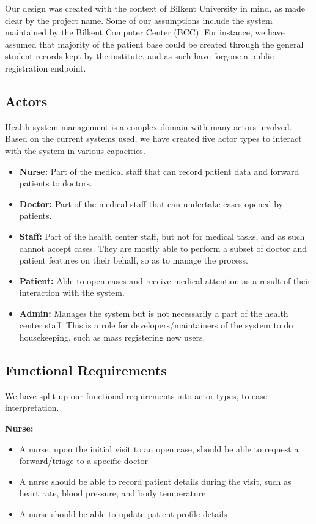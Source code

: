 \documentclass[a4paper, 12pt, titlepage]{article}
\begin{document}
  Our design was created with the context of Bilkent University in mind, as made clear by the project name.
  Some of our assumptions include the system maintained by the Bilkent Computer Center (BCC).
  For instance, we have assumed that majority of the patient base could be created through the general student records
  kept by the institute, and as such have forgone a public registration endpoint.

  \subsection{Actors}

  Health system management is a complex domain with many actors involved.
  Based on the current systems used, we have created five actor types to interact with the system in various capacities.

  \begin{itemize}
    \item \textbf{Nurse:} Part of the medical staff that can record patient data and forward patients to doctors.
    \item \textbf{Doctor:} Part of the medical staff that can undertake cases opened by patients.
    \item \textbf{Staff:} Part of the health center staff, but not for medical tasks, and as such cannot accept cases.
      They are mostly able to perform a subset of doctor and patient features on their behalf, so as to manage the process.
    \item \textbf{Patient:} Able to open cases and receive medical attention as a result of their interaction with the system.
    \item \textbf{Admin:} Manages the system but is not necessarily a part of the health center staff.
      This is a role for developers/maintainers of the system to do housekeeping, such as mass registering new users.
  \end{itemize}

  \pagebreak
  \subsection{Functional Requirements}

  We have split up our functional requirements into actor types, to ease interpretation.

  \textbf{Nurse:}
  \begin{itemize}
    \item A nurse, upon the initial visit to an open case, should be able to request a forward/triage to a specific doctor
    \item A nurse should be able to record patient details during the visit, such as heart rate, blood pressure, and body temperature
    \item A nurse should be able to update patient profile details
  \end{itemize}
\end{document}
